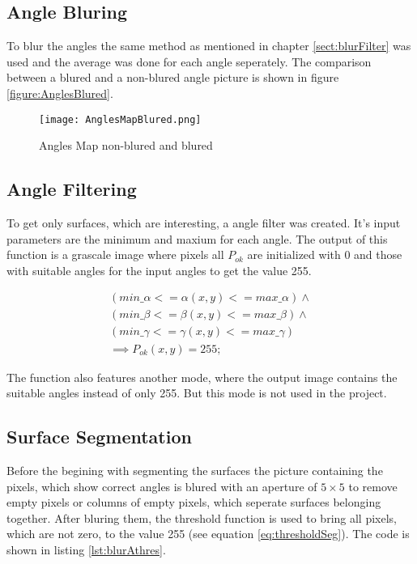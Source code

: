 \subsection{Angle Bluring}

To blur the angles the same method as mentioned in chapter \vref{sect:blurFilter} was used and
the average was done for each angle seperately. The comparison between a blured and a non-blured
angle picture is shown in figure \vref{figure:AnglesBlured}.

\begin{figure}[H]
\begin{center}
  \texttt{[image: AnglesMapBlured.png]}
  \caption{Angles Map non-blured and blured}
  \label{figure:AnglesBlured}
\end{center}
\end{figure}


\subsection{Angle Filtering}

To get only surfaces, which are interesting, a angle filter was created. It's input parameters
are the minimum and maxium for each angle. The output of this function is a grascale image
where pixels all $P_{ok}$ are initialized with 0 and those with suitable angles 
for the input angles to get the value 255.

\begin{gather}
(min\_\alpha  <= \alpha(x,y) <=max\_\alpha ) \wedge \nonumber\\ 
(min\_\beta  <= \beta(x,y) <=max\_\beta )\wedge\nonumber\\
(min\_\gamma  <= \gamma(x,y) <=max\_\gamma )\nonumber\\
\implies P_{ok}(x,y) = 255;
\end{gather}

The function also features another mode, where the output image contains the suitable angles instead of only 255.
But this mode is not used in the project. 

\subsection{Surface Segmentation}

Before the begining with segmenting the surfaces the picture containing the pixels, which show correct angles
is blured with an aperture of $5 \times 5$ to remove empty pixels or columns of empty pixels, 
which seperate surfaces belonging together. After bluring them, the threshold function is used to bring 
all pixels, which are not zero, to the value 255 (see equation \vref{eq:thresholdSeg}).
The code is shown in listing \vref{lst:blurAthres}.

